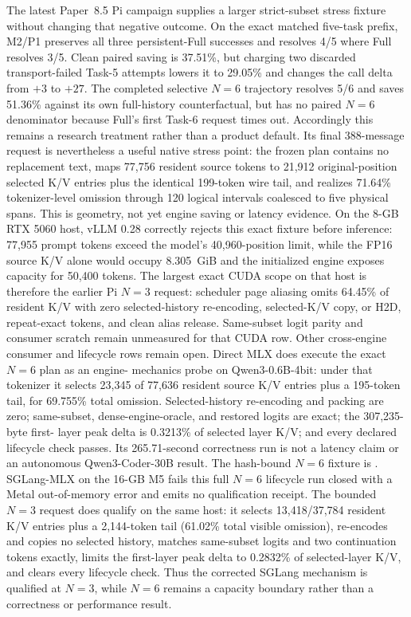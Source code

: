 \documentclass[11pt]{article}
\begin{document}
The latest Paper~8.5 Pi campaign supplies a larger strict-subset stress fixture
without changing that negative outcome.  On the exact matched five-task
prefix, M2/P1 preserves all three persistent-Full successes and resolves 4/5
where Full resolves 3/5.  Clean paired saving is 37.51\%, but charging two
discarded transport-failed Task-5 attempts lowers it to 29.05\% and changes the
call delta from $+3$ to $+27$.  The completed selective $N=6$ trajectory
resolves 5/6 and saves 51.36\% against its own full-history counterfactual, but
has no paired $N=6$ denominator because Full's first Task-6 request times out.
Accordingly this remains a research treatment rather than a product default.
Its final 388-message request is nevertheless a useful native stress point:
the frozen plan contains no replacement text, maps 77,756 resident source
tokens to 21,912 original-position selected K/V entries plus the identical
199-token wire tail, and realizes 71.64\% tokenizer-level omission through 120
logical intervals coalesced to five physical spans.  This is geometry, not yet
engine saving or latency evidence.  On the 8-GB RTX 5060 host, vLLM 0.28
correctly rejects this exact fixture before inference: 77,955 prompt tokens
exceed the model's 40,960-position limit, while the FP16 source K/V alone would
occupy 8.305~GiB and the initialized engine exposes capacity for 50,400 tokens.
The largest exact CUDA scope on that host is therefore the earlier Pi $N=3$
request: scheduler page aliasing omits 64.45\% of resident K/V with zero
selected-history re-encoding, selected-K/V copy, or H2D, repeat-exact tokens,
and clean alias release.  Same-subset logit parity and consumer scratch remain
unmeasured for that CUDA row.  Other cross-engine consumer and lifecycle rows
remain open.  Direct MLX does execute the exact $N=6$ plan as an engine-
mechanics probe on Qwen3-0.6B-4bit: under that tokenizer it selects 23,345 of
77,636 resident source K/V entries plus a 195-token tail, for 69.755\% total
omission.  Selected-history re-encoding and packing are zero; same-subset,
dense-engine-oracle, and restored logits are exact; the 307,235-byte first-
layer peak delta is 0.3213\% of selected layer K/V; and every declared lifecycle
check passes.  Its 265.71-second correctness run is not a latency claim or an
autonomous Qwen3-Coder-30B result.  The hash-bound $N=6$ fixture is
.
SGLang-MLX on the 16-GB M5 fails this full $N=6$ lifecycle run closed with a
Metal out-of-memory error and emits no qualification receipt.  The bounded
$N=3$ request does qualify on the same host: it selects 13,418/37,784 resident
K/V entries plus a 2,144-token tail (61.02\% total visible omission), re-encodes
and copies no selected history, matches same-subset logits and two continuation
tokens exactly, limits the first-layer peak delta to 0.2832\% of selected-layer
K/V, and clears every lifecycle check.  Thus the corrected SGLang mechanism is
qualified at $N=3$, while $N=6$ remains a capacity boundary rather than a
correctness or performance result.
\end{document}
